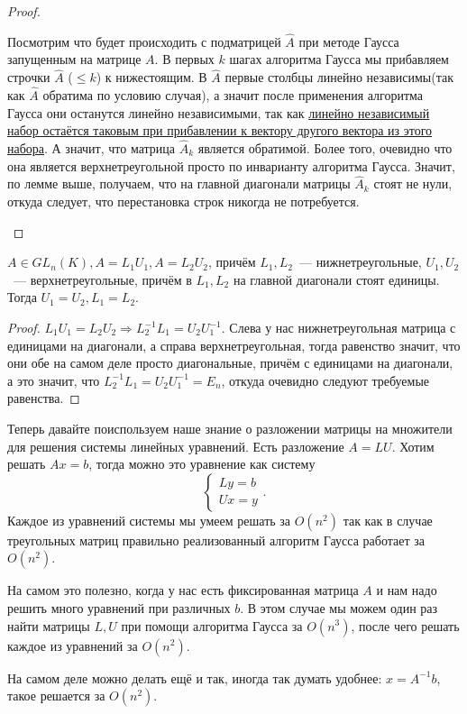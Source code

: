 \begin{proof}
\begin{itemize}
            Посмотрим что будет происходить с подматрицей $\hat{A}$ при методе Гаусса запущенным на матрице $A$.
            В первых $k$ шагах алгоритма Гаусса мы прибавляем строчки $\hat{A}$ ($\le k$) к нижестоящим.
            В $\hat{A}$ первые столбцы линейно независимы(так как $\hat{A}$ обратима по условию случая), а значит после
            применения алгоритма Гаусса они останутся линейно независимыми, так как
            \hyperref[2]{линейно независимый набор остаётся таковым при прибавлении к вектору 
            другого вектора из этого набора}.
            А значит, что матрица $\hat{A}_k$ является обратимой. Более того, очевидно что она является верхнетреугольной просто
            по инварианту алгоритма Гаусса. Значит, по лемме выше, получаем, что на главной диагонали матрицы $\hat{A}_k$ стоят не нули,
            откуда следует, что перестановка строк никогда не потребуется.
    \end{itemize}
\end{proof}
\begin{statement}
    $A\in GL_n(K), A = L_1U_1, A = L_2U_2$, причём $L_1,L_2$~--- нижнетреугольные, $U_1, U_2$~--- верхнетреугольные,
    причём в $L_1,L_2$ на главной диагонали стоят единицы. Тогда $U_1=U_2, L_1 =L_2$.
\end{statement}
\begin{proof}
    $L_1U_1 = L_2U_2\Rightarrow L_2^{-1}L_1 = U_2U_1^{-1}$. Слева у нас 
    нижнетреугольная матрица с единицами на диагонали, а справа верхнетреугольная, тогда равенство значит,
    что они обе на самом деле просто диагональные, причём с единицами на диагонали, 
    а это значит, что $L_2^{-1}L_1 = U_2U_1^{-1} = E_n$, откуда очевидно следуют требуемые равенства.
\end{proof}
\begin{remark}
    Теперь давайте поиспользуем наше знание о разложении матрицы на множители для 
    решения системы линейных уравнений.
    Есть разложение $A = LU$.
    Хотим решать $Ax = b$, 
    тогда можно это уравнение как систему
    \[
    \begin{cases}
        Ly = b\\
        Ux = y
    \end{cases}
    .\] 
    Каждое из уравнений системы мы умеем решать за $O(n^2)$ так как в случае треугольных матриц правильно реализованный
    алгоритм Гаусса работает за $O(n^2)$. 

    На самом это полезно, когда у нас есть фиксированная матрица $A$ и 
    нам надо решить много уравнений при различных $b$. 
    В этом случае мы можем один раз найти матрицы $L, U$ при помощи алгоритма Гаусса за $O(n^3)$, после чего решать
    каждое из уравнений за $O(n^2)$.

    На самом деле можно делать ещё и так, иногда так думать удобнее:
    $x = A^{-1}b$, такое решается за  $O(n^2)$.
\end{remark}
